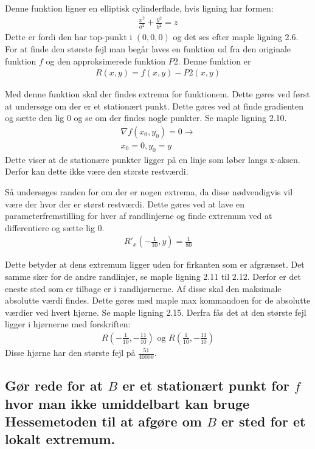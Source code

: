 Denne funktion ligner en elliptisk cylinderflade, hvis ligning har formen:
\begin{align}
    \frac{x^2}{a^2} + \frac{y^2}{b^2} = z
\end{align}
Dette er fordi den har top-punkt i $(0,0,0)$ og det ses efter maple ligning 2.6.
For at finde den største fejl man begår laves en funktion ud fra den originale funktion $f$ og den approksimerede funktion $P2$. Denne funktion er
\begin{align}
    R(x,y) = f(x,y)-P2(x,y)
\end{align}

Med denne funktion skal der findes extrema for funktionem. Dette gøres ved først at undersøge om der er et stationært punkt. Dette gøres ved at finde gradienten og sætte den lig 0 og se om der findes nogle punkter. Se maple ligning 2.10. 
\begin{align}
    \nabla f(x_0,y_0) = 0 \rightarrow \\
    x_0 = 0, y_0 = y
\end{align}
Dette viser at de stationære punkter ligger på en linje som løber langs x-aksen. Derfor kan dette ikke være den største restværdi.

Så undersøges randen for om der er nogen extrema, da disse nødvendigvis vil være der hvor der er størst restværdi. Dette gøres ved at lave en parameterfremstilling for hver af randlinjerne og finde extremum ved at differentiere og sætte lig 0.
\begin{align}
    R'_x \left( -\frac{1}{10},y \right)=\frac{1}{80}
\end{align}

Dette betyder at dens extremum ligger uden for firkanten som er afgrænset. Det samme sker for de andre randlinjer, se maple ligning 2.11 til 2.12. Derfor er det eneste sted som er tilbage er i randhjørnerne. Af disse skal den maksimale absolutte værdi findes. Dette gøres med maple max kommandoen for de absolutte værdier ved hvert hjørne. Se maple ligning 2.15.
Derfra fås det at den største fejl ligger i hjørnerne med forskriften:
\begin{align}
    R\left(-\frac{1}{10},-\frac{11}{10} \right) \text{ og } R \left(\frac{1}{10},-\frac{11}{10}\right)
\end{align}
Disse hjørne har den største fejl på $\frac{51}{40000}$.
\newpage
\subsection{Gør rede for at $B$ er et stationært punkt for $f$ hvor man ikke umiddelbart kan bruge Hessemetoden til at afgøre om $B$ er sted for et lokalt extremum.}

